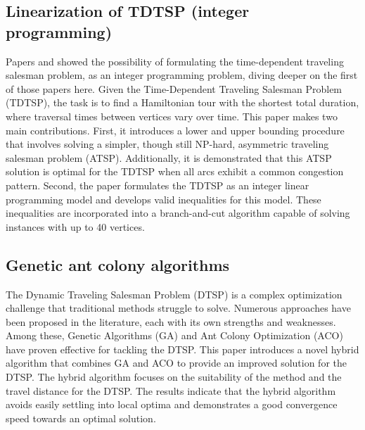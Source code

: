 \subsection{Linearization of TDTSP (integer programming) \cite{tdtsp-branch-cut}}
Papers \cite{tdtsp-branch-cut} and \cite{MONTERO2017280} showed the possibility of formulating the time-dependent traveling salesman problem, as an integer programming problem, diving deeper on the first of those papers here. Given the Time-Dependent Traveling Salesman Problem (TDTSP), the task is to find a Hamiltonian tour with the shortest total duration, where traversal times between vertices vary over time. This paper makes two main contributions. First, it introduces a lower and upper bounding procedure that involves solving a simpler, though still NP-hard, asymmetric traveling salesman problem (ATSP). Additionally, it is demonstrated that this ATSP solution is optimal for the TDTSP when all arcs exhibit a common congestion pattern. Second, the paper formulates the TDTSP as an integer linear programming model and develops valid inequalities for this model. These inequalities are incorporated into a branch-and-cut algorithm capable of solving instances with up to 40 vertices.

\subsection{Genetic ant colony algorithms}
The Dynamic Traveling Salesman Problem (DTSP) is a complex optimization challenge that traditional methods struggle to solve. Numerous approaches have been proposed in the literature, each with its own strengths and weaknesses. Among these, Genetic Algorithms (GA) and Ant Colony Optimization (ACO) have proven effective for tackling the DTSP. This paper \cite{Gharehchopogh2012} introduces a novel hybrid algorithm that combines GA and ACO to provide an improved solution for the DTSP. The hybrid algorithm focuses on the suitability of the method and the travel distance for the DTSP. The results indicate that the hybrid algorithm avoids easily settling into local optima and demonstrates a good convergence speed towards an optimal solution.